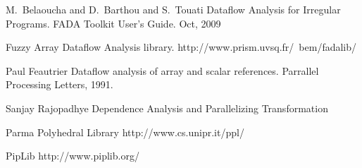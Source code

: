 \begin{thebibliography}{WW}
M.~Belaoucha and D.~Barthou and S.~Touati
\newblock Dataflow Analysis for Irregular Programs. FADA Toolkit User's Guide. Oct, 2009

Fuzzy Array Dataflow Analysis library.
\newblock http://www.prism.uvsq.fr/~bem/fadalib/

Paul Feautrier
\newblock Dataflow analysis of array and scalar references.
\newblock Parrallel Processing Letters, 1991.

Sanjay Rajopadhye
\newblock Dependence Analysis and Parallelizing Transformation

Parma Polyhedral Library
\newblock http://www.cs.unipr.it/ppl/

PipLib
\newblock http://www.piplib.org/

\end{thebibliography}





